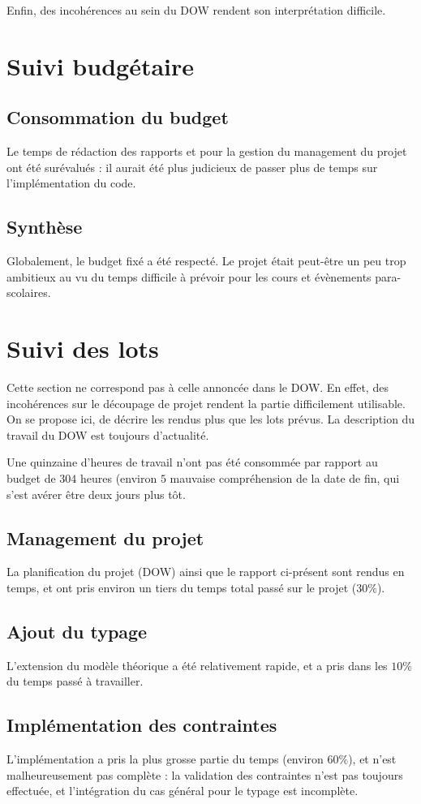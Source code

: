 \documentclass[a4paper]{article}
\begin{document}
Enfin, des incohérences au sein du DOW rendent son interprétation difficile.

\section{Suivi budgétaire}
\subsection{Consommation du budget}
Le temps de rédaction des rapports et pour la gestion du management du projet
ont été surévalués : il aurait été plus judicieux de passer plus de temps
sur l'implémentation du code.
\subsection{Synthèse}
Globalement, le budget fixé a été respecté. Le projet était peut-être un
peu trop ambitieux au vu du temps difficile à prévoir pour les cours et
évènements para-scolaires.
\section{Suivi des lots}
Cette section ne correspond pas à celle annoncée dans le DOW. En effet, des
incohérences sur le découpage de projet rendent la partie difficilement
utilisable. On se propose ici, de décrire les rendus plus que les lots
prévus. La description du travail du DOW est toujours d'actualité.

Une quinzaine d'heures de travail n'ont pas été consommée par rapport
au budget de $304$ heures (environ $5$%
mauvaise compréhension de la date de fin, qui s'est avérer être deux
jours plus tôt.

\subsection{Management du projet}
La planification du projet (DOW) ainsi que le rapport ci-présent sont
rendus en temps, et ont pris environ un tiers du temps total passé sur le
projet ($30\%$).
\subsection{Ajout du typage}
L'extension du modèle théorique a été relativement rapide, et a pris
dans les $10\%$ du temps passé à travailler.
\subsection{Implémentation des contraintes}
L'implémentation a pris la plus grosse partie du temps (environ $60\%$),
et n'est malheureusement pas complète : la validation des contraintes
n'est pas toujours effectuée, et l'intégration du cas général pour le typage
est incomplète.
\end{document}
